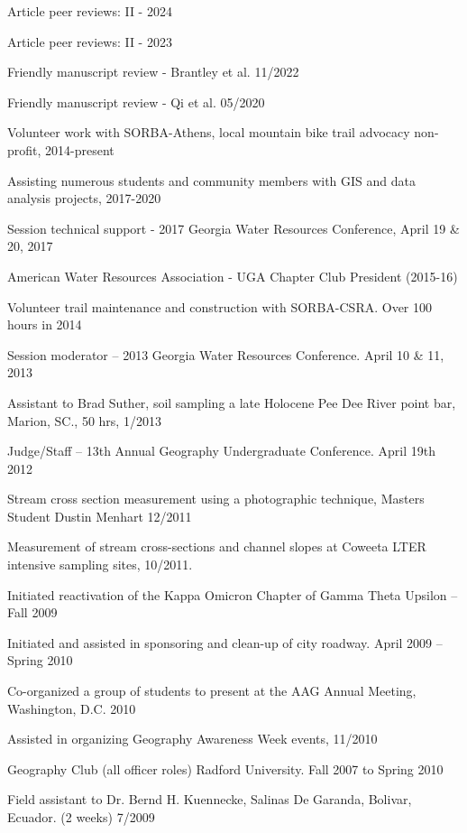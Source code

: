 \documentclass[10pt,letterpaper]{article}
\begin{document}
	\begin{itemize*}
		
		\item Article peer reviews: II - 2024
		\item Article peer reviews: II - 2023
		\item
		Friendly manuscript review - Brantley et al. 11/2022
		\item 
		Friendly manuscript review - Qi et al. 05/2020
		\item
		Volunteer work with SORBA-Athens, local mountain bike trail advocacy non-profit, 2014-present
		\item
		Assisting numerous students and community members with GIS and data analysis projects, 2017-2020
		\item
		Session technical support - 2017 Georgia Water Resources Conference, April 19 \& 20, 2017
		\item
		American Water Resources Association - UGA Chapter Club President (2015-16)
		\item
		Volunteer trail maintenance and construction with SORBA-CSRA. Over 100 hours in 2014
		\item
		Session moderator – 2013 Georgia Water Resources Conference. April 10 \& 11, 2013
		\item
		Assistant to Brad Suther, soil sampling a late Holocene Pee Dee River point bar, Marion, SC., 50 hrs, 1/2013
		\item
		Judge/Staff – 13th Annual Geography Undergraduate Conference. April 19th 2012
		\item
		Stream cross section measurement using a photographic technique, Masters Student Dustin Menhart 12/2011
		\item 
		Measurement of stream cross-sections and channel slopes at Coweeta LTER intensive sampling sites, 10/2011.
		\item 
		Initiated reactivation of the Kappa Omicron Chapter of Gamma Theta Upsilon – Fall 2009
		\item 
		Initiated and assisted in sponsoring and clean-up of city roadway. April 2009 – Spring 2010
		\item 
		Co-organized a group of students to present at the AAG Annual Meeting, Washington, D.C. 2010
		\item 
		Assisted in organizing Geography Awareness Week events, 11/2010
		\item 
		Geography Club (all officer roles) Radford University. Fall 2007 to Spring 2010
		\item 
		Field assistant to Dr. Bernd H. Kuennecke, Salinas De Garanda, Bolivar, Ecuador. (2 weeks) 7/2009
		
		
	\end{itemize*}
	
	
\end{document}
